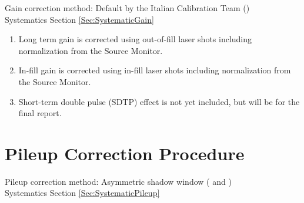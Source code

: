 	Gain correction method: Default by the Italian Calibration Team () \\
	\noindent Systematics Section \ref{Sec:SystematicGain}

	\begin{enumerate}
		\item{Long term gain is corrected using out-of-fill laser shots including normalization from the Source Monitor.}
		\item{In-fill gain is corrected using in-fill laser shots including normalization from the Source Monitor.}
		\item{Short-term double pulse (SDTP) effect is not yet included, but will be for the final report.}
	\end{enumerate}


\section{Pileup Correction Procedure}
\label{Sec:PileupCorrection}

	Pileup correction method: Asymmetric shadow window ( and ) \\
	\noindent Systematics Section \ref{Sec:SystematicPileup}

